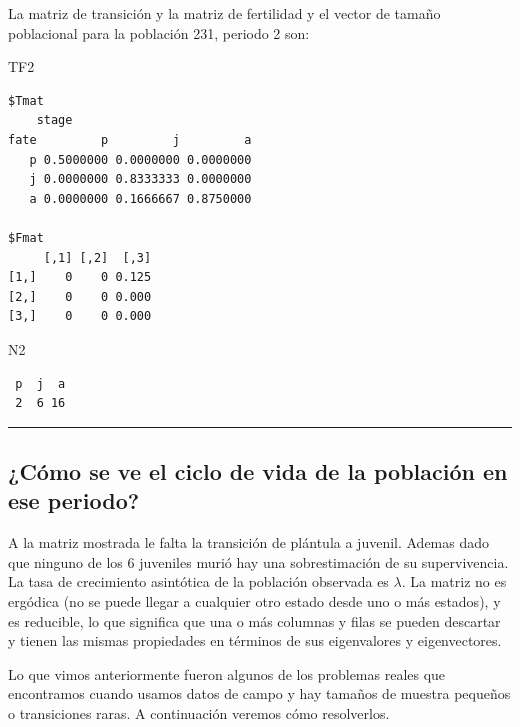 \documentclass[
  12pt,
  letterpaper,
]{book}
\newenvironment{Shaded}{\begin{snugshade}}{\end{snugshade}}
\newcommand{\NormalTok}[1]{\textcolor[rgb]{0.00,0.23,0.31}{#1}}
\begin{document}
La matriz de transición y la matriz de fertilidad y el vector de tamaño
poblacional para la población 231, periodo 2 son:

\begin{Shaded}
\begin{Highlighting}[]
\NormalTok{TF2}
\end{Highlighting}
\end{Shaded}

\begin{verbatim}
$Tmat
    stage
fate         p         j         a
   p 0.5000000 0.0000000 0.0000000
   j 0.0000000 0.8333333 0.0000000
   a 0.0000000 0.1666667 0.8750000

$Fmat
     [,1] [,2]  [,3]
[1,]    0    0 0.125
[2,]    0    0 0.000
[3,]    0    0 0.000
\end{verbatim}

\begin{Shaded}
\begin{Highlighting}[]
\NormalTok{N2}
\end{Highlighting}
\end{Shaded}

\begin{verbatim}
 p  j  a 
 2  6 16 
\end{verbatim}

\begin{center}\rule{0.5\linewidth}{0.5pt}\end{center}

\subsection{¿Cómo se ve el ciclo de vida de la población en ese
periodo?}\label{cuxf3mo-se-ve-el-ciclo-de-vida-de-la-poblaciuxf3n-en-ese-periodo}

A la matriz mostrada le falta la transición de plántula a juvenil.
Ademas dado que ninguno de los 6 juveniles murió hay una sobrestimación
de su supervivencia. La tasa de crecimiento asintótica de la población
observada es \(\lambda\). La matriz no es ergódica (no se puede llegar a
cualquier otro estado desde uno o más estados), y es reducible, lo que
significa que una o más columnas y filas se pueden descartar y tienen
las mismas propiedades en términos de sus eigenvalores y eigenvectores.

Lo que vimos anteriormente fueron algunos de los problemas reales que
encontramos cuando usamos datos de campo y hay tamaños de muestra
pequeños o transiciones raras. A continuación veremos cómo resolverlos.
\end{document}
